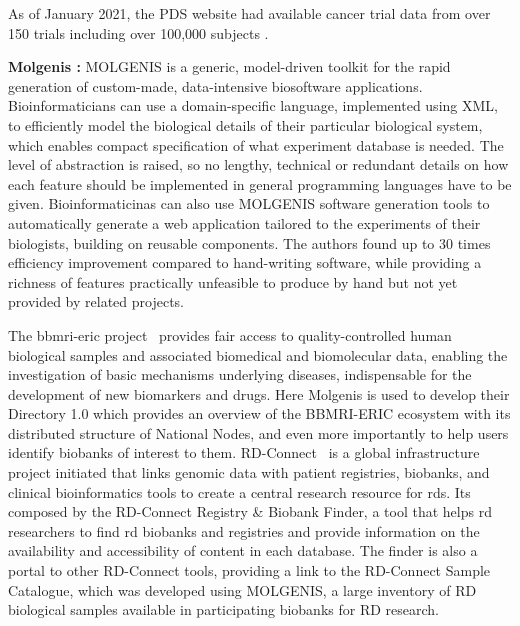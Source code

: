 As of January 2021, the PDS website had available cancer trial data from over 150
trials including over 100,000 subjects \cite{datasphere-site}.

\textbf{Molgenis \cite{molgenis}:}
MOLGENIS is a generic, model-driven toolkit for the rapid generation of custom-made,
data-intensive biosoftware applications.
Bioinformaticians can use a domain-specific language, implemented using XML, to
efficiently model the biological details of their particular biological system, which
enables compact specification of what experiment database is needed.
The level of abstraction is raised, so no lengthy, technical or redundant details on
how each feature should be implemented in general programming languages have to be
given.
Bioinformaticinas can also use MOLGENIS software generation tools to automatically
generate a web application tailored to the experiments of their biologists, building on
reusable components.
The authors found up to 30 times efficiency improvement compared to hand-writing
software, while providing a richness of features practically unfeasible to produce by
hand but not yet provided by related projects.

The \gls{bbmri-eric} project~\cite{bbmrieric} provides fair access to
quality-controlled human biological samples and associated biomedical and biomolecular
data, enabling the investigation of basic mechanisms underlying diseases, indispensable
for the development of new biomarkers and drugs.
Here Molgenis is used to develop their Directory 1.0 which provides an overview of the
BBMRI-ERIC ecosystem with its distributed structure of National Nodes, and even more
importantly to help users identify biobanks of interest to them.
RD-Connect~\cite{rdconnect} is a global infrastructure project initiated that links
genomic data with patient registries, biobanks, and clinical bioinformatics tools to
create a central research resource for \gls{rd}s.
Its composed by the RD-Connect Registry \& Biobank Finder, a tool that helps \gls{rd}
researchers to find \gls{rd} biobanks and registries and provide information on the
availability and accessibility of content in each database.
The finder is also a portal to other RD-Connect tools, providing a link to the
RD-Connect Sample Catalogue, which was developed using MOLGENIS, a large inventory of
RD biological samples available in participating biobanks for RD research. 


